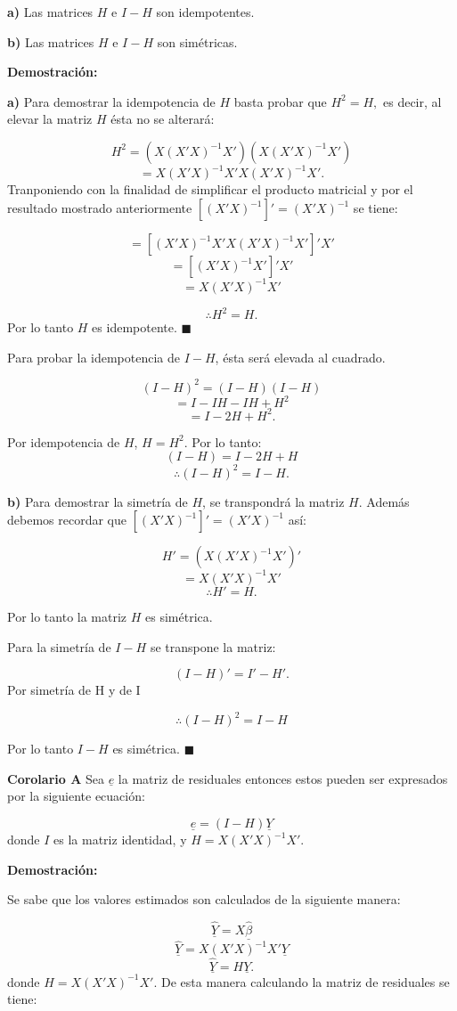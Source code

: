 \documentclass[
  a4paper,
  oneside,
  openany]{book}
\begin{document}
\textbf{a)} Las matrices \(H\) e \(I-H\) son idempotentes.

\textbf{b)} Las matrices \(H\) e \(I-H\) son simétricas.

\textbf{Demostración:}

\textbf{a)} Para demostrar la idempotencia de \(H\) basta probar que \(H^2=H,\) es decir, al elevar la matriz \(H\) ésta no se alterará:

\[H^2=(X(X'X)^{-1}X')(X(X'X)^{-1}X')\]
\[=X(X'X)^{-1}X'X(X'X)^{-1}X'.\]
Tranponiendo con la finalidad de simplificar el producto matricial y por el resultado mostrado anteriormente \([(X'X)^{-1}]'=(X'X)^{-1}\) se tiene:

\[=[(X'X)^{-1}X'X(X'X)^{-1}X']'X'\]
\[=[(X'X)^{-1}X']'X'\]
\[=X(X'X)^{-1}X'\]

\[\therefore H^2=H.\]
Por lo tanto \(H\) es idempotente. \(\blacksquare\)

Para probar la idempotencia de \(I-H\), ésta será elevada al cuadrado.

\[(I-H)^2=(I-H)(I-H)\]
\[=I-IH-IH+H^2\]
\[=I-2H+H^2.\]

Por idempotencia de \(H\), \(H=H^2\). Por lo tanto:
\[(I-H)=I-2H+H\]
\[\therefore (I-H)^2=I-H.\]

\textbf{b)} Para demostrar la simetría de \(H\), se transpondrá la matriz \(H\). Además debemos recordar que \([(X'X)^{-1}]'=(X'X)^{-1}\) así:

\[H'= (X(X'X)^{-1}X')'\]
\[=X(X'X)^{-1}X'\]
\[\therefore H'= H.\]

Por lo tanto la matriz \(H\) es simétrica.

Para la simetría de \(I-H\) se transpone la matriz:

\[(I-H)'=I'-H'.\]
Por simetría de H y de I

\[\therefore (I-H)^2=I-H\]

Por lo tanto \(I-H\) es simétrica. \(\blacksquare\)

\textbf{Corolario A} Sea \(\underline{e}\) la matriz de residuales entonces estos pueden ser expresados por la siguiente ecuación:

\[\underline{e}=(I-H)\underline{Y}\]
donde \(I\) es la matriz identidad, y \(H=X(X'X)^{-1}X'.\)

\textbf{Demostración:}

Se sabe que los valores estimados son calculados de la siguiente manera:

\[\underline{\hat{Y}}=X\underline{\hat{\beta}}\]
\[\underline{\hat{Y}}=X(X'X)^{-1}X'\underline{Y}\]
\[\underline{\hat{Y}}=H\underline{Y}.\]
donde \(H=X(X'X)^{-1}X'.\) De esta manera calculando la matriz de residuales se tiene:
\end{document}
